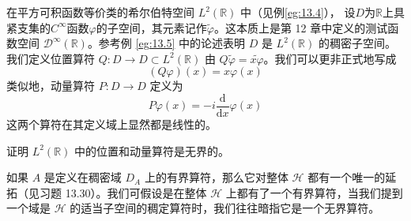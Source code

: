 \begin{eg}\label{eg:13.17}
    在平方可积函数等价类的希尔伯特空间 \(L^{2}(\mathbb{R})\) 中（见例\ref{eg:13.4}）， 设\(D\)为\(\mathbb{R}\)上具紧支集的\(C^{\infty}\)函数\(\varphi\)的子空间，其元素记作\(\widetilde{\varphi}\)。这本质上是第 12 章中定义的测试函数空间 \(\mathcal{D}^{\infty}(\mathbb{R})\)。参考例 \ref{eg:13.5} 中的论述表明 \(D\) 是 \(L^{2}(\mathbb{R})\) 的稠密子空间。我们定义位置算符 \(Q: D \rightarrow D \subset L^{2}(\mathbb{R}) \) 由 \(Q \widetilde{\varphi}=\widetilde{x \varphi}\)。我们可以更非正式地写成
\[
(Q \varphi)(x)=x \varphi(x) 
\]
类似地，动量算符 \(P: D \rightarrow D\) 定义为
\[
P \varphi(x)=-i \frac{\mathrm{d}}{\mathrm{d} x} \varphi(x)
\]
这两个算符在其定义域上显然都是线性的。
\end{eg}
\begin{exercise}
    证明 \(L^{2}(\mathbb{R})\) 中的位置和动量算符是无界的。
\end{exercise}
如果 \(A\) 是定义在稠密域 \(D_{A}\) 上的有界算符，那么它对整体 \(\mathcal{H}\) 都有一个唯一的延拓（见习题 13.30）。我们可假设是在整体 \(\mathcal{H}\) 上都有了一个有界算符，当我们提到一个域是 \(\mathcal{H}\) 的适当子空间的稠定算符时，我们往往暗指它是一个无界算符。
